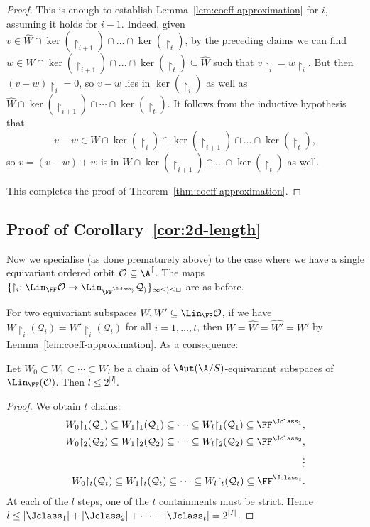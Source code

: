 \begin{proof}
This is enough to establish Lemma~\ref{lem:coeff-approximation} for $i$, assuming it holds for $i-1$.
Indeed, given $v \in \widehat W \cap \ker(\restriction_{i+1}) \cap \dots \cap \ker(\restriction_t)$, by the preceding claims
we can find $w \in W \cap \ker(\restriction_{i+1}) \cap \dots \cap \ker(\restriction_t) \subseteq \widehat W$ such that 
$v {\restriction_i} = w {\restriction_i}$.
But then $(v - w) {\restriction_{i}} = 0$, so $v - w$ lies in $\ker(\restriction_{i})$ as well as $\widehat W \cap \ker(\restriction_{i+1}) \cap \cdots \cap \ker(\restriction_t)$.
It follows from the inductive hypothesis that \[
    v - w \in W \cap \ker(\restriction_i) \cap \ker(\restriction_{i+1}) \cap \dots \cap \ker(\restriction_t),
\]
so $v = (v - w) + w$ is in $W \cap \ker(\restriction_{i+1}) \cap \dots \cap \ker(\restriction_t)$ as well.

This completes the proof of Theorem~\ref{thm:coeff-approximation}.
\end{proof}


\subsection{Proof of Corollary~\ref{cor:2d-length}}
Now we specialise (as done prematurely above) to the case where we have a single equivariant ordered orbit $\cal O \subseteq \A^d$.
The maps $\{\restriction_i : \Lin_\FF \cal O \to \Lin_{\FF^{\Jclass_i}} \cal Q_i\}_{1 \leq i \leq t}$ are as before.

For two equivariant subspaces $W, W' \subseteq \Lin_\FF \cal O$, 
if we have $W {\restriction_i}(\mathcal{Q}_i) = W' {\restriction_i}(\mathcal{Q}_i)$ for all $i=1,\ldots, t$,
then $W = \widehat W = \widehat{W'} = W'$ by Lemma~\ref{lem:coeff-approximation}.
As a consequence:

\begin{proposition}\label{prop:length-upper-bound}
    Let $W_0 \subset W_1 \subset \cdots \subset W_l$ be a chain of $\Aut(\A/S)$-equivariant subspaces of $\Lin_\FF(\mathcal{O})$.
    Then $l \leq 2^{|I|}$. 
\end{proposition}
\begin{proof}
    We obtain $t$ chains:
    \begin{align*}
        W_0 {\restriction_1} (\mathcal{Q}_1) \subseteq W_1 {\restriction_1} (\mathcal{Q}_1) \subseteq \cdots \subseteq W_l {\restriction_1} (\mathcal{Q}_1) \subseteq \FF^{\Jclass_1}, \\
        W_0 {\restriction_2} (\mathcal{Q}_2) \subseteq W_1 {\restriction_2} (\mathcal{Q}_2) \subseteq \cdots \subseteq W_l {\restriction_2} (\mathcal{Q}_2) \subseteq \FF^{\Jclass_2}, \\
        \vdots \\
        W_0 {\restriction_t} (\mathcal{Q}_t) \subseteq W_1 {\restriction_t} (\mathcal{Q}_t) \subseteq \cdots \subseteq W_l {\restriction_t} (\mathcal{Q}_t) \subseteq \FF^{\Jclass_t}.
    \end{align*}
    At each of the $l$ steps, one of the $t$ containments must be strict.
    Hence $l \leq |\Jclass_1| + |\Jclass_2| + \dots + |\Jclass_t| = 2^{|I|}$. 
\end{proof}

